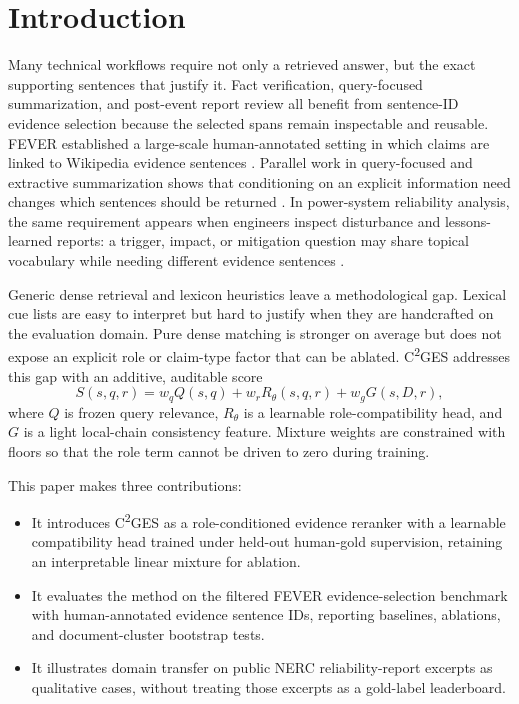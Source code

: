 \documentclass[cmc,article,submit,moreauthors,pdftex]{Definitions/tsp}
\newcommand{\cges}{C\textsuperscript{2}GES}
\begin{document}
\section{Introduction}
\label{sec:introduction}

Many technical workflows require not only a retrieved answer, but the exact supporting sentences that justify it. Fact verification, query-focused summarization, and post-event report review all benefit from sentence-ID evidence selection because the selected spans remain inspectable and reusable. FEVER established a large-scale human-annotated setting in which claims are linked to Wikipedia evidence sentences \cite{thorne2018fever}. Parallel work in query-focused and extractive summarization shows that conditioning on an explicit information need changes which sentences should be returned \cite{zhong2021qmsum,zhong2020extractive,vig2022exploring}. In power-system reliability analysis, the same requirement appears when engineers inspect disturbance and lessons-learned reports: a trigger, impact, or mitigation question may share topical vocabulary while needing different evidence sentences \cite{xie2022massively,madabhushi2023survey}.

Generic dense retrieval and lexicon heuristics leave a methodological gap. Lexical cue lists are easy to interpret but hard to justify when they are handcrafted on the evaluation domain. Pure dense matching is stronger on average but does not expose an explicit role or claim-type factor that can be ablated. \cges{} addresses this gap with an additive, auditable score
\begin{equation}
S(s,q,r)=w_q Q(s,q)+w_r R_\theta(s,q,r)+w_g G(s,D,r),
\end{equation}
where $Q$ is frozen query relevance, $R_\theta$ is a learnable role-compatibility head, and $G$ is a light local-chain consistency feature. Mixture weights are constrained with floors so that the role term cannot be driven to zero during training.

This paper makes three contributions:
\begin{itemize}
  \item It introduces \cges{} as a role-conditioned evidence reranker with a learnable compatibility head trained under held-out human-gold supervision, retaining an interpretable linear mixture for ablation.
  \item It evaluates the method on the filtered FEVER evidence-selection benchmark with human-annotated evidence sentence IDs, reporting baselines, ablations, and document-cluster bootstrap tests.
  \item It illustrates domain transfer on public NERC reliability-report excerpts as qualitative cases, without treating those excerpts as a gold-label leaderboard.
\end{itemize}
\end{document}
